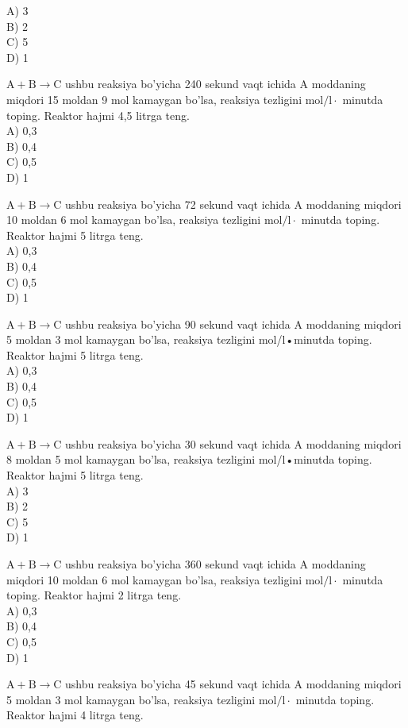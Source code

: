 A) 3\\
B) 2\\
C) 5\\
D) 1
  \item $\mathrm{A}+\mathrm{B} \rightarrow \mathrm{C}$ ushbu reaksiya bo'yicha 240 sekund vaqt ichida A moddaning miqdori 15 moldan 9 mol kamaygan bo'lsa, reaksiya tezligini $\mathrm{mol} / \mathrm{l} \cdot$ minutda toping. Reaktor hajmi 4,5 litrga teng.\\
A) 0,3\\
B) 0,4\\
C) 0,5\\
D) 1
  \item $\mathrm{A}+\mathrm{B} \rightarrow \mathrm{C}$ ushbu reaksiya bo'yicha 72 sekund vaqt ichida A moddaning miqdori 10 moldan 6 mol kamaygan bo'lsa, reaksiya tezligini $\mathrm{mol} / \mathrm{l} \cdot$ minutda toping. Reaktor hajmi 5 litrga teng.\\
A) 0,3\\
B) 0,4\\
C) 0,5\\
D) 1
  \item $\mathrm{A}+\mathrm{B} \rightarrow \mathrm{C}$ ushbu reaksiya bo'yicha 90 sekund vaqt ichida A moddaning miqdori 5 moldan 3 mol kamaygan bo'lsa, reaksiya tezligini mol/l•minutda toping. Reaktor hajmi 5 litrga teng.\\
A) 0,3\\
B) 0,4\\
C) 0,5\\
D) 1
  \item $\mathrm{A}+\mathrm{B} \rightarrow \mathrm{C}$ ushbu reaksiya bo'yicha 30 sekund vaqt ichida A moddaning miqdori 8 moldan 5 mol kamaygan bo'lsa, reaksiya tezligini mol/l•minutda toping. Reaktor hajmi 5 litrga teng.\\
A) 3\\
B) 2\\
C) 5\\
D) 1
  \item $\mathrm{A}+\mathrm{B} \rightarrow \mathrm{C}$ ushbu reaksiya bo'yicha 360 sekund vaqt ichida A moddaning miqdori 10 moldan 6 mol kamaygan bo'lsa, reaksiya tezligini $\mathrm{mol} / \mathrm{l} \cdot$ minutda toping. Reaktor hajmi 2 litrga teng.\\
A) 0,3\\
B) 0,4\\
C) 0,5\\
D) 1
  \item $\mathrm{A}+\mathrm{B} \rightarrow \mathrm{C}$ ushbu reaksiya bo'yicha 45 sekund vaqt ichida A moddaning miqdori 5 moldan 3 mol kamaygan bo'lsa, reaksiya tezligini $\mathrm{mol} / \mathrm{l} \cdot$ minutda toping. Reaktor hajmi 4 litrga teng.\\
